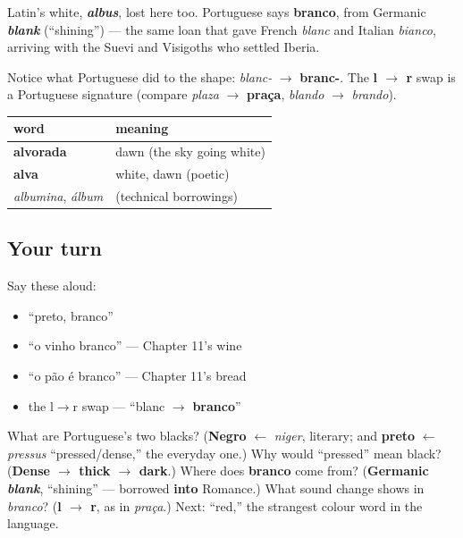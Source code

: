 \begin{cousinweb}
Latin's white, \emph{\textbf{albus}}, lost here too. Portuguese says \textbf{branco}, from Germanic \emph{\textbf{blank}} (\textquotedblleft{}shining\textquotedblright{}) — the same loan that gave French \emph{blanc} and Italian \emph{bianco}, arriving with the Suevi and Visigoths who settled Iberia.

Notice what Portuguese did to the shape: \emph{blanc-} $\to$ \textbf{branc-}. The \textbf{l $\to$ r} swap is a Portuguese signature (compare \emph{plaza} $\to$ \textbf{praça}, \emph{blando} $\to$ \emph{brando}).
\end{cousinweb}

\begin{cousinweb}
\noindent
\begin{tabularx}{\linewidth}{@{}>{\raggedright\arraybackslash}X>{\raggedright\arraybackslash}X@{}}
\toprule
\textbf{word} & \textbf{meaning} \\
\midrule
\textbf{alvorada} & dawn (the sky going white) \\
\textbf{alva} & white, dawn (poetic) \\
\emph{albumina}, \emph{álbum} & (technical borrowings) \\
\bottomrule
\end{tabularx}
\end{cousinweb}

\subsection*{Your turn}
Say these aloud:

\begin{itemize}
\raggedright
  \item \textquotedblleft{}preto, branco\textquotedblright{}
  \item \textquotedblleft{}o vinho branco\textquotedblright{} — Chapter 11's wine
  \item \textquotedblleft{}o pão é branco\textquotedblright{} — Chapter 11's bread
  \item the l$\to$r swap — \textquotedblleft{}blanc $\to$ \textbf{branco}\textquotedblright{}
\end{itemize}

\begin{tcolorbox}[breakable,colback=teal!4,colframe=teal!35!black,title={Before you move on}]
What are Portuguese's two blacks? (\textbf{Negro} $\leftarrow$ \emph{niger}, literary; and \textbf{preto} $\leftarrow$ \emph{pressus} \textquotedblleft{}pressed/dense,\textquotedblright{} the everyday one.) Why would \textquotedblleft{}pressed\textquotedblright{} mean black? (\textbf{Dense $\to$ thick $\to$ dark}.) Where does \textbf{branco} come from? (\textbf{Germanic \emph{blank}}, \textquotedblleft{}shining\textquotedblright{} — borrowed \textbf{into} Romance.) What sound change shows in \emph{branco}? (\textbf{l $\to$ r}, as in \emph{praça}.) Next: \textquotedblleft{}red,\textquotedblright{} the strangest colour word in the language.
\end{tcolorbox}
